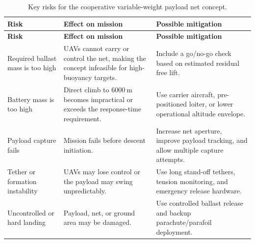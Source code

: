 {
\small
\setlength{\LTleft}{0pt}
\setlength{\LTright}{0pt}

\begin{longtable}{@{}p{} p{} p{}@{}}
\caption{Key risks for the cooperative variable-weight payload net concept.}
\label{tab:conceptD_key_risks} \\
\toprule
\textbf{Risk} & \textbf{Effect on mission} & \textbf{Possible mitigation} \\
\midrule
\endfirsthead

\toprule
\textbf{Risk} & \textbf{Effect on mission} & \textbf{Possible mitigation} \\
\midrule
\endhead

\bottomrule
\endfoot

Required ballast mass is too high & UAVs cannot carry or control the net, making the concept infeasible for high-buoyancy targets. & Include a go/no-go check based on estimated residual free lift. \\
Battery mass is too high & Direct climb to \(6000~\mathrm{m}\) becomes impractical or exceeds the response-time requirement. & Use carrier aircraft, pre-positioned loiter, or lower operational altitude envelope. \\
Payload capture fails & Mission fails before descent initiation. & Increase net aperture, improve payload tracking, and allow multiple capture attempts. \\
Tether or formation instability & UAVs may lose control or the payload may swing unpredictably. & Use long stand-off tethers, tension monitoring, and emergency release hardware. \\
Uncontrolled or hard landing & Payload, net, or ground area may be damaged. & Use controlled ballast release and backup parachute/parafoil deployment. \\

\end{longtable}
}










